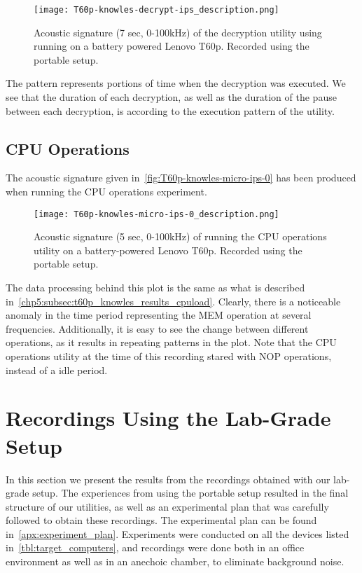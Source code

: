 \begin{figure}[ht]
    \centering
    \texttt{[image: T60p-knowles-decrypt-ips\_description.png]}
    \caption{Acoustic signature (7 sec, 0-100kHz) of the decryption utility using running on a battery powered Lenovo T60p.
        Recorded using the portable setup.}
    \label{fig:T60p-knowles-decrypt-ips}
\end{figure}

The pattern represents portions of time when the decryption was executed.
We see that the duration of each decryption, as well as the duration of the pause between each decryption, is according to the execution pattern of the utility.


\subsection{CPU Operations}\label{chp5:subsec:t60p_knowles_results_micro}
The acoustic signature given in~\autoref{fig:T60p-knowles-micro-ips-0} has been produced when running the CPU operations experiment.

\begin{figure}[ht]
    \centering
    \texttt{[image: T60p-knowles-micro-ips-0\_description.png]}
    \caption{Acoustic signature (5 sec, 0-100kHz) of running the CPU operations utility on a battery-powered Lenovo T60p.
        Recorded using the portable setup.}
    \label{fig:T60p-knowles-micro-ips-0}
\end{figure}

The data processing behind this plot is the same as what is described in~\autoref{chp5:subsec:t60p_knowles_results_cpuload}.
Clearly, there is a noticeable anomaly in the time period representing the MEM operation at several frequencies.
Additionally, it is easy to see the change between different operations, as it results in repeating patterns in the plot.
Note that the CPU operations utility at the time of this recording stared with NOP operations, instead of a idle period.



\section{Recordings Using the Lab-Grade Setup}\label{chp5:sec:bk_results}
In this section we present the results from the recordings obtained with our lab-grade setup.
The experiences from using the portable setup resulted in the final structure of our utilities, as well as an experimental plan that was carefully followed to obtain these recordings.
The experimental plan can be found in~\autoref{apx:experiment_plan}.
Experiments were conducted on all the devices listed in~\autoref{tbl:target_computers}, and recordings were done both in an office environment as well as in an anechoic chamber, to eliminate background noise.

